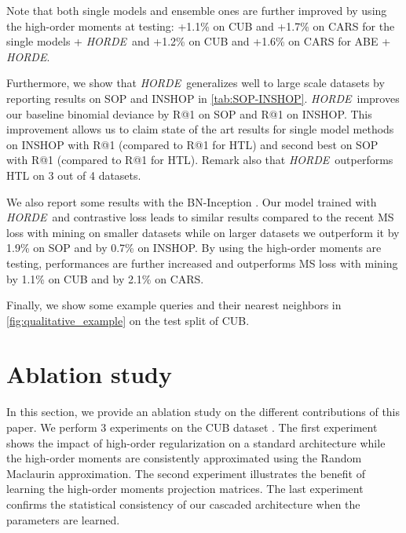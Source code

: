 \documentclass[10pt,twocolumn,letterpaper]{article}
\def\ourmethod{\textit{HORDE}}
\begin{document}
    Note that both single models and ensemble ones are further improved by using the high-order moments at testing: +1.1\% on CUB and +1.7\% on CARS for the single models + \ourmethod \ and +1.2\% on CUB and +1.6\% on CARS for ABE + \ourmethod.
    
    Furthermore, we show that \ourmethod \ generalizes well to large scale datasets by reporting results on SOP and INSHOP in \autoref{tab:SOP-INSHOP}.
    \ourmethod\ improves our baseline binomial deviance by  R@1 on SOP and  R@1 on INSHOP.
    This improvement allows us to claim state of the art results for single model methods on INSHOP with  R@1 (compared to  R@1 for HTL) and second best on SOP with  R@1 (compared to  R@1 for HTL).
    Remark also that \ourmethod \ outperforms HTL on 3 out of 4 datasets.
    
    We also report some results with the BN-Inception \cite{Ioffe_2015_ICML}.
    Our model trained with \ourmethod \ and contrastive loss leads to similar results compared to the recent MS loss with mining \cite{Wang_2019_CVPR} on smaller datasets while on larger datasets we outperform it by 1.9\% on SOP and by 0.7\% on INSHOP.
    By using the high-order moments are testing, performances are further increased and outperforms MS loss with mining by 1.1\% on CUB and by 2.1\% on CARS.
    
    Finally, we show some example queries and their nearest neighbors in \autoref{fig:qualitative_example} on the test split of CUB. 
\section{Ablation study}\label{sec:abation_studies}
    In this section, we provide an ablation study on the different contributions of this paper.
    We perform 3 experiments on the CUB dataset \cite{CUB_200_2011}.
    The first experiment shows the impact of high-order regularization on a standard architecture while the high-order moments are consistently approximated using the Random Maclaurin approximation.
    The second experiment illustrates the benefit of learning the high-order moments projection matrices.
    The last experiment confirms the statistical consistency of our cascaded architecture when the parameters are learned.
    
\end{document}
